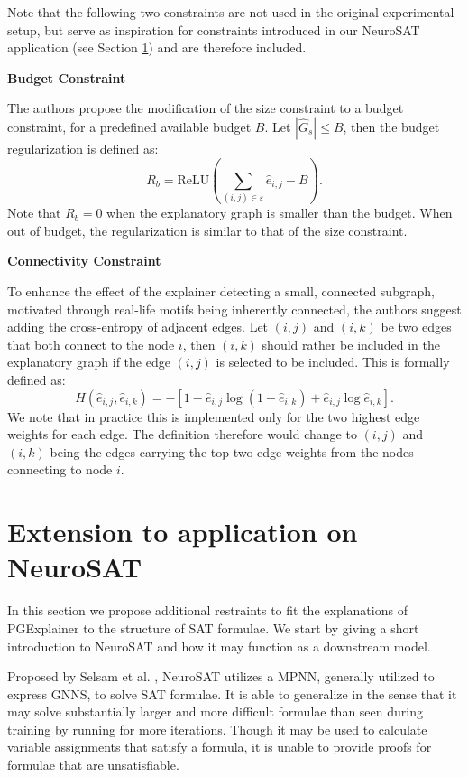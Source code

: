 Note that the following two constraints are not used in the original experimental setup, but serve as inspiration for constraints introduced in our NeuroSAT application (see Section \ref{sec:NeuroSAT_extension}) and are therefore included. \bigskip

\textbf{Budget Constraint}\par
The authors propose the modification of the size constraint to a budget constraint, for a predefined available budget $B$. Let $|\hat{G}_s| \leq B$, then the budget regularization is defined as:
\begin{equation}
    R_b = \text{ReLU}(\sum_{(i,j)\in \varepsilon}\hat{e}_{i,j}-B).
\end{equation}
Note that $R_b = 0$ when the explanatory graph is smaller than the budget. When out of budget, the regularization is similar to that of the size constraint. \bigskip

\textbf{Connectivity Constraint}\par
To enhance the effect of the explainer detecting a small, connected subgraph, motivated through real-life motifs being inherently connected, the authors suggest adding the cross-entropy of adjacent edges. Let $(i,j)$ and $(i,k)$ be two edges that both connect to the node $i$, then $(i,k)$ should rather be included in the explanatory graph if the edge $(i,j)$ is selected to be included. This is formally defined as:
\begin{equation}
    H(\hat{e}_{i,j},\hat{e}_{i,k}) = -[1-\hat{e}_{i,j}\log(1-\hat{e}_{i,k})+\hat{e}_{i,j}\log \hat{e}_{i,k}].
\end{equation}
We note that in practice this is implemented only for the two highest edge weights for each edge. The definition therefore would change to $(i,j)$ and $(i,k)$ being the edges carrying the top two edge weights from the nodes connecting to node $i$.


\section{Extension to application on NeuroSAT}
\label{sec:NeuroSAT_extension}
In this section we propose additional restraints to fit the explanations of PGExplainer to the structure of SAT formulae. We start by giving a short introduction to NeuroSAT\cite{selsam2018learning} and how it may function as a downstream model.

 \bigskip
Proposed by Selsam et al. \cite{selsam2018learning}, NeuroSAT utilizes a MPNN, generally utilized to express GNNS, to solve SAT formulae. It is able to generalize in the sense that it may solve substantially larger and more difficult formulae than seen during training by running for more iterations. Though it may be used to calculate variable assignments that satisfy a formula, it is unable to provide proofs for formulae that are unsatisfiable.


